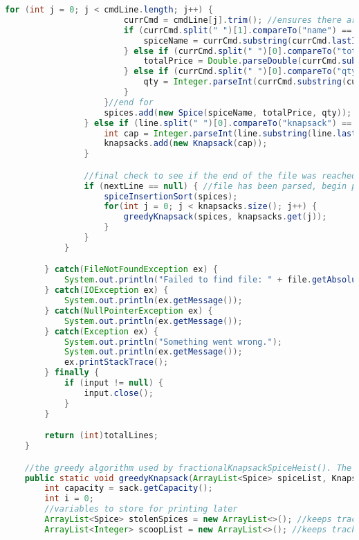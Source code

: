 \documentclass[letterpaper, 10pt,DIV=13]{scrartcl}
\numberwithin{equation}{section} %
\numberwithin{figure}{section} %
\numberwithin{table}{section} %
\begin{document}
\begin{lstlisting}[frame=single, language=java, breaklines]
                    for (int j = 0; j < cmdLine.length; j++) {
                        currCmd = cmdLine[j].trim(); //ensures there are no leading spaces
                        if (currCmd.split(" ")[1].compareTo("name") == 0) {
                            spiceName = currCmd.substring(currCmd.lastIndexOf(" ")+1).split(";")[0];
                        } else if (currCmd.split(" ")[0].compareTo("total_price") == 0){
                            totalPrice = Double.parseDouble(currCmd.substring(currCmd.lastIndexOf(" ")+1).split(";")[0]);
                        } else if (currCmd.split(" ")[0].compareTo("qty") == 0){
                            qty = Integer.parseInt(currCmd.substring(currCmd.lastIndexOf(" ")+1).split(";")[0]);
                        }
                    }//end for
                    spices.add(new Spice(spiceName, totalPrice, qty));
                } else if (line.split(" ")[0].compareTo("knapsack") == 0) {
                    int cap = Integer.parseInt(line.substring(line.lastIndexOf(" ")+1).split(";")[0]); //parses the capacity of the knapsack
                    knapsacks.add(new Knapsack(cap));
                }

                //final check to see if the end of the file was reached
                if (nextLine == null) { //file has been parsed, begin processing
                    spiceInsertionSort(spices);
                    for(int j = 0; j < knapsacks.size(); j++) {
                        greedyKnapsack(spices, knapsacks.get(j));
                    }
                }
            }

        } catch(FileNotFoundException ex) {
            System.out.println("Failed to find file: " + file.getAbsolutePath());
        } catch(IOException ex) {
            System.out.println(ex.getMessage());
        } catch(NullPointerException ex) {
            System.out.println(ex.getMessage());
        } catch(Exception ex) {
            System.out.println("Something went wrong.");
            System.out.println(ex.getMessage());
            ex.printStackTrace();
        } finally {
            if (input != null) {
                input.close();
            }
        }

        return (int)totalLines;
    }

    //the greedy algorithm used by fractionalKnapsackSpiceHeist(). The algorithm assumes the list of spices is already in descending order in terms of price per scoop of spice, meaning the highest price per scoop spice is first
    public static void greedyKnapsack(ArrayList<Spice> spiceList, Knapsack sack) {
        int capacity = sack.getCapacity();
        int i = 0;
        //variables to store for printing later
        ArrayList<Spice> stolenSpices = new ArrayList<>(); //keeps track of the spice piles that were placed into the sack
        ArrayList<Integer> scoopList = new ArrayList<>(); //keeps track of how many scoops of each spice were taken. Indexes here are a 1:1 correlation to the Spice in stolenSpices


\end{lstlisting}
\end{document}
